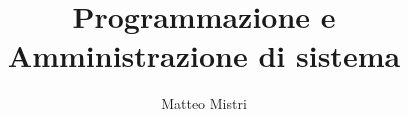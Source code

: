 \documentclass[a4paper,12pt]{report} %
\begin{document}

\title{Programmazione e Amministrazione di sistema} 
\author{Matteo Mistri}
\maketitle %
\tableofcontents %


\end{document}
